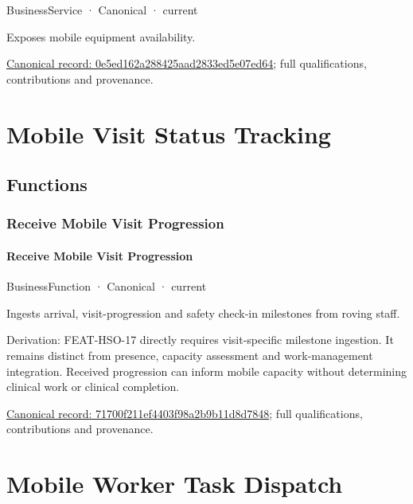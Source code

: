 \label{element:0e5ed162a288425aad2833ed5e07ed64}
{\small BusinessService · Canonical · current}\par

Exposes mobile equipment availability.


{\footnotesize \href{../../../../continuum/business/business-service/0e5ed162a288425aad2833ed5e07ed64.md}{Canonical record: 0e5ed162a288425aad2833ed5e07ed64}; full qualifications, contributions and provenance.}\par
\section{Mobile Visit Status Tracking}

\subsection{Functions}

\subsubsection{Receive Mobile Visit Progression}

\paragraph{Receive Mobile Visit Progression}

\label{element:71700f211ef4403f98a2b9b11d8d7848}
{\small BusinessFunction · Canonical · current}\par

Ingests arrival, visit-progression and safety check-in milestones from roving staff.



Derivation: FEAT-HSO-17 directly requires visit-specific milestone ingestion. It remains distinct from presence, capacity assessment and work-management integration. Received progression can inform mobile capacity without determining clinical work or clinical completion.


{\footnotesize \href{../../../../continuum/business/business-function/71700f211ef4403f98a2b9b11d8d7848.md}{Canonical record: 71700f211ef4403f98a2b9b11d8d7848}; full qualifications, contributions and provenance.}\par
\section{Mobile Worker Task Dispatch}

